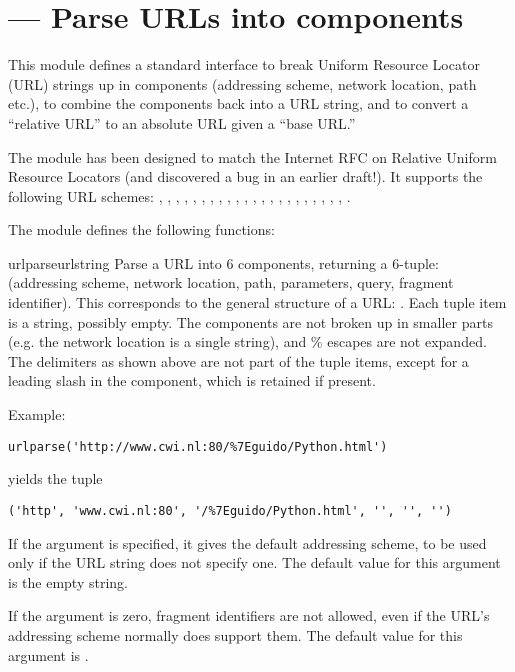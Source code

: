 \section{ ---
         Parse URLs into components}




This module defines a standard interface to break Uniform Resource
Locator (URL) strings up in components (addressing scheme, network
location, path etc.), to combine the components back into a URL
string, and to convert a ``relative URL'' to an absolute URL given a
``base URL.''

The module has been designed to match the Internet RFC on Relative
Uniform Resource Locators (and discovered a bug in an earlier
draft!). It supports the following URL schemes:
, , , , , 
, , , , , 
, , , , , 
, , , , , 
, , .

The  module defines the following functions:

\begin{funcdesc}{urlparse}{urlstring}
Parse a URL into 6 components, returning a 6-tuple: (addressing
scheme, network location, path, parameters, query, fragment
identifier).  This corresponds to the general structure of a URL:
.
Each tuple item is a string, possibly empty.
The components are not broken up in smaller parts (e.g. the network
location is a single string), and \% escapes are not expanded.
The delimiters as shown above are not part of the tuple items,
except for a leading slash in the  component, which is
retained if present.

Example:

\begin{verbatim}
urlparse('http://www.cwi.nl:80/%7Eguido/Python.html')
\end{verbatim}

yields the tuple

\begin{verbatim}
('http', 'www.cwi.nl:80', '/%7Eguido/Python.html', '', '', '')
\end{verbatim}

If the  argument is specified, it gives the
default addressing scheme, to be used only if the URL string does not
specify one.  The default value for this argument is the empty string.

If the  argument is zero, fragment identifiers
are not allowed, even if the URL's addressing scheme normally does
support them.  The default value for this argument is .
\end{funcdesc}

